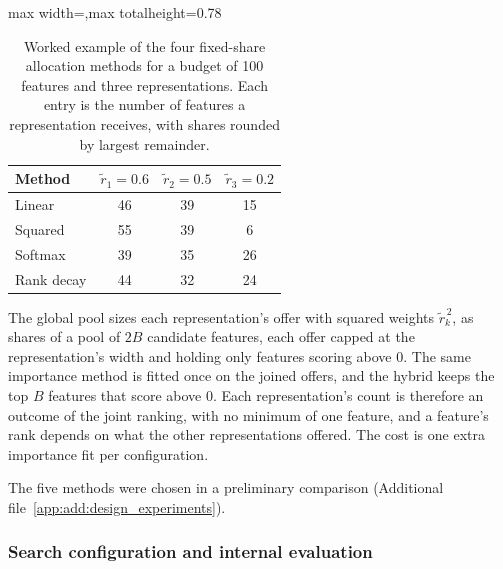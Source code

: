 \begin{table}[htbp]
\centering
\begin{adjustbox}{max width=\textwidth,max totalheight=0.78\textheight}
\begin{tabular}{@{}lccc@{}}
\toprule
Method & $\tilde r_1 = 0.6$ & $\tilde r_2 = 0.5$ & $\tilde r_3 = 0.2$ \\
\midrule
Linear & 46 & 39 & 15 \\
Squared & 55 & 39 & 6 \\
Softmax & 39 & 35 & 26 \\
Rank decay & 44 & 32 & 24 \\
\bottomrule
\end{tabular}
\end{adjustbox}
\caption[Worked example of the four fixed-share allocation methods.]{Worked example of the four fixed-share allocation methods for a budget of 100 features and three representations. Each entry is the number of features a representation receives, with shares rounded by largest remainder.}
\label{tab:alloc_example}
\end{table}

The global pool sizes each representation's offer with squared weights $\tilde r_k^{\,2}$, as shares of a pool of $2B$ candidate features, each offer capped at the representation's width and holding only features scoring above 0. The same importance method is fitted once on the joined offers, and the hybrid keeps the top $B$ features that score above 0. Each representation's count is therefore an outcome of the joint ranking, with no minimum of one feature, and a feature's rank depends on what the other representations offered. The cost is one extra importance fit per configuration.


The five methods were chosen in a preliminary comparison (Additional file~\ref{app:add:design_experiments}).

\subsubsection{Search configuration and internal evaluation}

